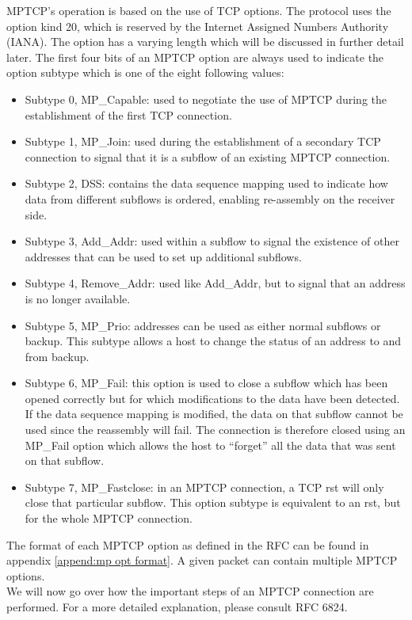 MPTCP's operation is based on the use of TCP options. The protocol uses the option kind 20, which is reserved by the Internet Assigned Numbers Authority (IANA). The option has a varying length which will be discussed in further detail later. The first four bits of an MPTCP option are always used to indicate the option subtype which is one of the eight following values:

\begin{itemize}
\item Subtype 0, MP\_Capable: used to negotiate the use of MPTCP during the establishment of the first TCP connection.
\item Subtype 1, MP\_Join: used during the establishment of a secondary TCP connection to signal that it is a subflow of an existing MPTCP connection.
\item Subtype 2, DSS: contains the data sequence mapping used to indicate how data from different subflows is ordered, enabling re-assembly on the receiver side.
\item Subtype 3, Add\_Addr: used within a subflow to signal the existence of other addresses that can be used to set up additional subflows.
\item Subtype 4, Remove\_Addr: used like Add\_Addr, but to signal that an address is no longer available.
\item Subtype 5, MP\_Prio: addresses can be used as either normal subflows or backup. This subtype allows a host to change the status of an address to and from backup.
\item Subtype 6, MP\_Fail: this option is used to close a subflow which has been opened correctly but for which modifications to the data have been detected. If the data sequence mapping is modified, the data on that subflow cannot be used since the reassembly will fail. The connection is therefore closed using an MP\_Fail option which allows the host to ``forget'' all the data that was sent on that subflow.
\item Subtype 7, MP\_Fastclose: in an MPTCP connection, a TCP rst will only close that particular subflow. This option subtype is equivalent to an rst, but for the whole MPTCP connection.
\end{itemize}

The format of each MPTCP option as defined in the RFC can be found in appendix \ref{append:mp opt format}. A given packet can contain multiple MPTCP options.\\

We will now go over how the important steps of an MPTCP connection are performed. For a more detailed explanation, please consult RFC 6824.\\ 



